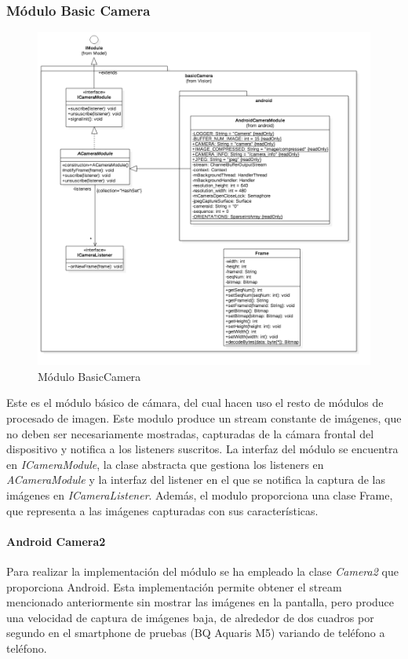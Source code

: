 \subsubsection{Módulo Basic Camera}
\begin{figure}
	\centering
	\includegraphics[width=1\linewidth]{imagenes/diagramas/BasicCameraModule.png}
	\caption{Módulo BasicCamera}
	\label{fig:basic-camera-module}
\end{figure}
Este es el módulo básico de cámara, del cual hacen uso el resto de módulos de procesado de imagen. Este modulo produce un stream constante de imágenes, que no deben ser necesariamente mostradas, capturadas de la cámara frontal del dispositivo y notifica a los listeners suscritos.
La interfaz del módulo se encuentra en \textit{ICameraModule}, la clase abstracta que gestiona los listeners en \textit{ACameraModule} y la interfaz del listener en el que se notifica la captura de las imágenes en \textit{ICameraListener}. Además, el modulo proporciona una clase Frame, que representa a las imágenes capturadas con sus características.

\paragraph*{Android Camera2\\}
Para realizar la implementación del módulo se ha empleado la clase \textit{Camera2} que proporciona Android. Esta implementación permite obtener el stream mencionado anteriormente sin mostrar las imágenes en la pantalla, pero produce una velocidad de captura de imágenes baja, de alrededor de dos cuadros por segundo en el smartphone de pruebas (BQ Aquaris M5) variando de teléfono a teléfono.
